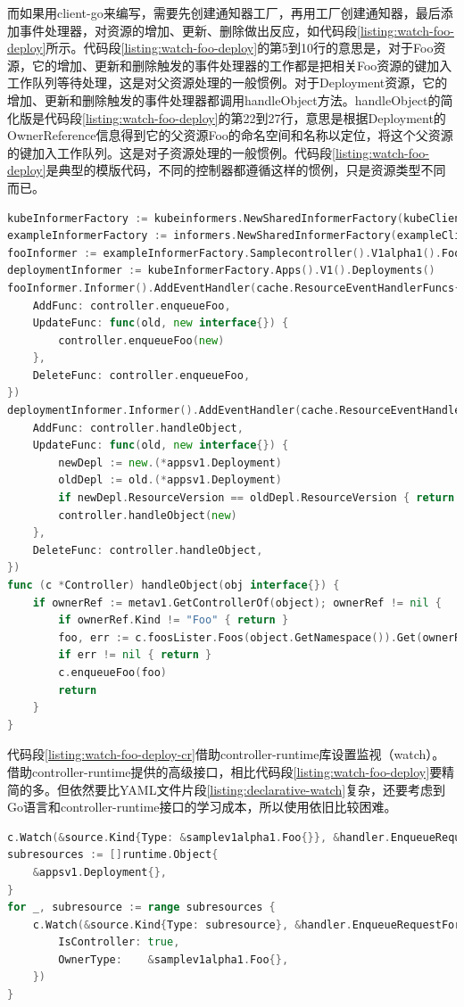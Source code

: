 \documentclass[macfonts,master]{njuthesis}
\begin{document}
而如果用client-go来编写，需要先创建通知器工厂，再用工厂创建通知器，最后添加事件处理器，对资源的增加、更新、删除做出反应，如代码段\ref{listing:watch-foo-deploy}所示。代码段\ref{listing:watch-foo-deploy}的第5到10行的意思是，对于Foo资源，它的增加、更新和删除触发的事件处理器的工作都是把相关Foo资源的键加入工作队列等待处理，这是对父资源处理的一般惯例。对于Deployment资源，它的增加、更新和删除触发的事件处理器都调用handleObject方法。handleObject的简化版是代码段\ref{listing:watch-foo-deploy}的第22到27行，意思是根据Deployment的OwnerReference信息得到它的父资源Foo的命名空间和名称以定位，将这个父资源的键加入工作队列。这是对子资源处理的一般惯例。代码段\ref{listing:watch-foo-deploy}是典型的模版代码，不同的控制器都遵循这样的惯例，只是资源类型不同而已。
\begin{lstlisting}[language=Go,caption=sample-controller中监视Foo和Deployment的代码段,label=listing:watch-foo-deploy]
kubeInformerFactory := kubeinformers.NewSharedInformerFactory(kubeClient, time.Second*30)
exampleInformerFactory := informers.NewSharedInformerFactory(exampleClient, time.Second*30)
fooInformer := exampleInformerFactory.Samplecontroller().V1alpha1().Foos()
deploymentInformer := kubeInformerFactory.Apps().V1().Deployments()
fooInformer.Informer().AddEventHandler(cache.ResourceEventHandlerFuncs{
	AddFunc: controller.enqueueFoo,
	UpdateFunc: func(old, new interface{}) {
		controller.enqueueFoo(new)
	},
	DeleteFunc: controller.enqueueFoo,
})
deploymentInformer.Informer().AddEventHandler(cache.ResourceEventHandlerFuncs{
	AddFunc: controller.handleObject,
	UpdateFunc: func(old, new interface{}) {
		newDepl := new.(*appsv1.Deployment)
		oldDepl := old.(*appsv1.Deployment)
		if newDepl.ResourceVersion == oldDepl.ResourceVersion { return }
		controller.handleObject(new)
	},
	DeleteFunc: controller.handleObject,
})
func (c *Controller) handleObject(obj interface{}) {
	if ownerRef := metav1.GetControllerOf(object); ownerRef != nil {
		if ownerRef.Kind != "Foo" { return }
		foo, err := c.foosLister.Foos(object.GetNamespace()).Get(ownerRef.Name)
		if err != nil { return }
		c.enqueueFoo(foo)
		return
	}
}
\end{lstlisting}

代码段\ref{listing:watch-foo-deploy-cr}借助controller-runtime库设置监视（watch）。借助controller-runtime提供的高级接口，相比代码段\ref{listing:watch-foo-deploy}要精简的多。但依然要比YAML文件片段\ref{listing:declarative-watch}复杂，还要考虑到Go语言和controller-runtime接口的学习成本，所以使用依旧比较困难。
\begin{lstlisting}[language=Go,caption=controller-runtime版sample-controller中监视Foo和Deployment的代码段,label=listing:watch-foo-deploy-cr]
c.Watch(&source.Kind{Type: &samplev1alpha1.Foo{}}, &handler.EnqueueRequestForObject{})
subresources := []runtime.Object{
    &appsv1.Deployment{},
}
for _, subresource := range subresources {
    c.Watch(&source.Kind{Type: subresource}, &handler.EnqueueRequestForOwner{
        IsController: true,
        OwnerType:    &samplev1alpha1.Foo{},
    })
}
\end{lstlisting}
\end{document}
